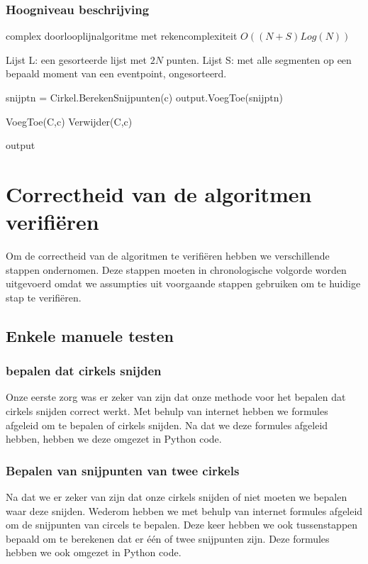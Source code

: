 \documentclass[11pt,a4paper]{article}
\begin{document}
\subsubsection{Hoogniveau beschrijving}
\begin{algorithm}
\caption{complex doorlooplijnalgoritme met rekencomplexiteit $O((N+S)Log(N))$}
\begin{algorithmic}
\State Lijst L: een gesorteerde lijst met $2N$ punten.
\State Lijst S: met alle segmenten op een bepaald moment van een eventpoint, ongesorteerd.

\State snijptn = Cirkel.BerekenSnijpunten(c)
\State output.VoegToe(snijptn)

\State VoegToe(C,c)
\EndIf
{}
\State Verwijder(C,c)
\EndIf
\EndFor

\Return output
\end{algorithmic}
\end{algorithm}

\section{Correctheid van de algoritmen verifi\"eren}

Om de correctheid van de algoritmen te verifi\"eren hebben we verschillende stappen ondernomen. Deze stappen moeten in chronologische volgorde worden uitgevoerd omdat we assumpties uit voorgaande stappen gebruiken om te huidige stap te verifi\"eren.

\subsection{Enkele manuele testen}

\subsubsection*{bepalen dat cirkels snijden}
Onze eerste zorg was er zeker van zijn dat onze methode voor het bepalen dat cirkels snijden correct werkt. Met behulp van internet hebben we formules afgeleid om te bepalen of cirkels snijden. Na dat we deze formules afgeleid hebben, hebben we deze omgezet in Python code.

\subsubsection*{Bepalen van snijpunten van twee cirkels}
Na dat we er zeker van zijn dat onze cirkels snijden of niet moeten we bepalen waar deze snijden. Wederom hebben we met behulp van internet formules afgeleid om de snijpunten van circels te bepalen. Deze keer hebben we ook tussenstappen bepaald om te berekenen dat er \'e\'en of twee snijpunten zijn. Deze formules hebben we ook omgezet in Python code.
\end{document}

